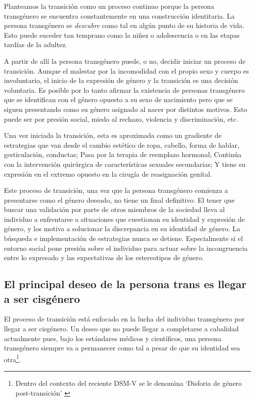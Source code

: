 Planteamos la transición como un proceso continuo porque la persona transgénero
se encuentra constantemente en una construcción identitaria. La persona
transgénero se \emph{descubre} como tal en algún punto de su historia de vida.
Esto puede suceder tan temprano como la niñez o adolescencia o en las etapas
tardías de la adultez.

A partir de allí la persona transgénero puede, o no, decidir iniciar un proceso
de transición. Aunque el malestar por la incomodidad con el propio sexo y cuerpo
es involuntario, el inicio de la expresión de género y la transición es una
decisión voluntaria. Es posible por lo tanto afirmar la existencia de personas
transgénero que se identifican con el género opuesto a su sexo de nacimiento
pero que se siguen presentando como su género asignado al nacer por distintos
motivos. Esto puede ser por presión social, miedo al rechazo, violencia y
discriminación, etc.

Una vez iniciada la transición, esta es aproximada como un gradiente de
estrategias que van desde el cambio estético de ropa, cabello, forma de hablar,
gesticulación, conductas; Pasa por la terapia de reemplazo hormonal; Continúa
con la intervención quirúrgica de características sexuales secundarias; Y tiene
su expresión en el extremo opuesto en la cirugía de reasignación genital.

Este proceso de transición, una vez que la persona transgénero comienza a
presentarse como el género deseado, no tiene un final definitivo. El tener que
buscar una validación por parte de otros miembros de la sociedad lleva al
individuo a enfrentarse a situaciones que cuestionan su identidad y expresión de
género, y los motiva a solucionar la discrepancia en su identidad de género. La
búsqueda e implementación de estrategias nunca se detiene. Especialmente si el
entorno social pone presión sobre el individuo para actuar sobre la
incongruencia entre lo expresado y las expectativas de los estereotipos de
género.

\subsection{El principal deseo de la persona trans es llegar a ser cisgénero}

El proceso de transición está enfocado en la lucha del individuo
transgénero por llegar a ser cisgénero. Un deseo que no puede llegar a
completarse a cabalidad actualmente pues, bajo los estándares médicos y
científicos, una persona transgénero siempre va a permanecer como tal a pesar de
que su identidad sea otra\footnote{Dentro del contexto del reciente DSM-V se le
denomina ‘Disforia de género post-transición’ \parencite[p. 453]{APA2016}}.

